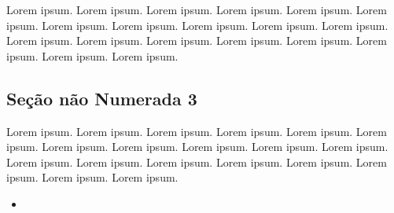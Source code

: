 \documentclass[
]{book}
\providecommand{\tightlist}{%
  \setlength{\itemsep}{0pt}\setlength{\parskip}{0pt}}
\begin{document}
Lorem ipsum. Lorem ipsum. Lorem ipsum. Lorem ipsum. Lorem ipsum. Lorem ipsum. Lorem ipsum. Lorem ipsum. Lorem ipsum. Lorem ipsum. Lorem ipsum. Lorem ipsum. Lorem ipsum. Lorem ipsum. Lorem ipsum. Lorem ipsum. Lorem ipsum. Lorem ipsum. Lorem ipsum.

\hypertarget{seuxe7uxe3o-nuxe3o-numerada-3-3}{%
\subsection*{Seção não Numerada 3}\label{seuxe7uxe3o-nuxe3o-numerada-3-3}}

Lorem ipsum. Lorem ipsum. Lorem ipsum. Lorem ipsum. Lorem ipsum. Lorem ipsum. Lorem ipsum. Lorem ipsum. Lorem ipsum. Lorem ipsum. Lorem ipsum. Lorem ipsum. Lorem ipsum. Lorem ipsum. Lorem ipsum. Lorem ipsum. Lorem ipsum. Lorem ipsum. Lorem ipsum.

\begin{itemize}
\tightlist
\item
\end{itemize}

  
\end{document}
